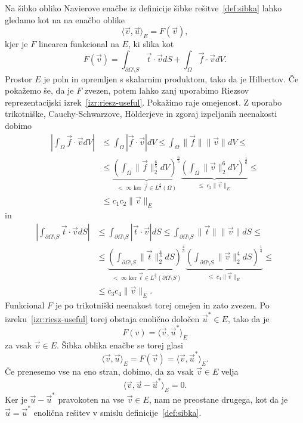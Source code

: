 \documentclass[a4paper,twoside]{article}
\theoremstyle{definition} %
\theoremstyle{plain} %
\numberwithin{equation}{section}
\newcommand{\vv}{\vec{v}}
\newcommand{\vt}{\vec{t}}
\newcommand{\vu}{\vec{u}}
\newcommand{\vf}{\vec{f}}
\begin{document}
Na šibko obliko Navierove enačbe iz definicije šibke rešitve~\ref{def:sibka}
lahko gledamo kot na na enačbo oblike
\[
  \langle \vv, \vu \rangle_E = F(\vv),
\]
kjer je $F$ linearen funkcional na $E$, ki slika kot
\[
  F(\vv) = \int_{\partial \Omega\setminus S} \vt\cdot \vv dS +
  \int_{\Omega} \vf\cdot \vv dV.
\]
Prostor $E$ je poln in opremljen s skalarnim produktom, tako da je Hilbertov.
Če pokažemo še, da je $F$ zvezen, potem lahko zanj uporabimo Riezsov
reprezentacijski izrek~\ref{izr:riesz-useful}. Pokažimo raje omejenost. Z
uporabo trikotniške, Cauchy-Schwarzove, H\"olderjeve in zgoraj izpeljanih
neenakosti dobimo
\begin{align*}
  \left| \int_\Omega \vf \cdot \vv dV \right| &\leq
  \int_\Omega \left|\vf \cdot \vv \right| dV \leq
  \int_\Omega \|\vf\| \|\vv\| dV \leq \\
  &\leq \underbrace{\left(\int_\Omega \|\vf\|_2^\frac65 dV \right)^\frac65}_{<\;\infty
    \text{ ker }\vf \in L^\frac65(\Omega)} \underbrace{\left( \int_\Omega
    \|\vv\|_2^6dV\right)^\frac16}_{\leq \; c_2 \|\vv\|_E} \leq \\
    &\leq c_1 c_2 \|\vv\|_E
\end{align*}
in
\begin{align*}
  \left| \int_{\partial \Omega \setminus S} \vt \cdot \vv dS \right| &\leq
  \int_{\partial \Omega \setminus S} \left|\vt \cdot \vv \right| dS \leq
  \int_{\partial \Omega \setminus S} \|\vt\| \|\vv\| dS \leq \\
  &\leq \underbrace{\left(\int_{\partial \Omega \setminus S} \|\vt\|_2^\frac43 dS \right)^\frac43}_{<\;\infty
    \text{ ker }\vt \in L^\frac43({\partial \Omega \setminus S})} \underbrace{\left( \int_{\partial \Omega \setminus S}
    \|\vv\|_2^4dS\right)^\frac14}_{\leq \; c_4 \|\vv\|_E} \leq \\
    &\leq c_3 c_4 \|\vv\|_E.
\end{align*}
Funkcional $F$ je po trikotniški neenakost torej omejen in zato zvezen. Po
izreku~\ref{izr:riesz-useful} torej obstaja enolično določen $\vu^\ast \in E$,
tako da je
\[ F(v) = \langle \vv, \vu^\ast \rangle_E \]
za vsak $\vv \in E$. Šibka oblika enačbe se torej glasi
\[
  \langle \vv, \vu \rangle_E = F(\vv) = \langle \vv, \vu^\ast \rangle_E.
\]
Če prenesemo vse na eno stran, dobimo, da za vsak $\vv \in E$ velja
\[
  \langle \vv, \vu - \vu^\ast \rangle_E = 0.
\]
Ker je $\vu-\vu^\ast$ pravokoten na vse $\vv \in E$, nam ne preostane drugega,
kot da je $\vu = \vu^\ast$ enolična rešitev v smislu definicije~\ref{def:sibka}.
\endproof
\end{document}

